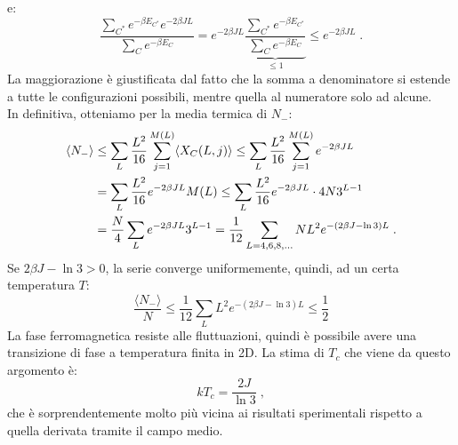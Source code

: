 \documentclass[10pt,a4paper]{report}
\theoremstyle{definition}
\numberwithin{equation}{section}
\newcommand{\bra}{\langle}
\newcommand{\ket}{\rangle}
\begin{document}
\begin{itemize}
$$$$
e:
\begin{equation}
\frac{\sum_{C^*}e^{-\beta E_{C^*}}e^{-2\beta JL}}{\sum_C e^{-\beta E_C}}=e^{-2\beta JL}\underbrace{\frac{\sum_{C^*}e^{-\beta E_{C^*}}}{\sum_C e^{-\beta E_C}}}_{\le 1}\le e^{-2\beta JL}\;.
\end{equation}
La maggiorazione è giustificata dal fatto che la somma a denominatore si estende a tutte le configurazioni possibili, mentre quella al numeratore solo ad alcune. \\
In definitiva, otteniamo per la media termica di $N_-$:
\begin{align}
\bra N_-\ket &\le \sum_L\frac{L^2}{16}\sum_{j=1}^{M(L)}\bra X_C(L,j)\ket \le \sum_L\frac{L^2}{16}\sum_{j=1}^{M(L)}e^{-2\beta JL} \notag \\
&=\sum_L\frac{L^2}{16}e^{-2\beta JL}M(L) \le \sum_L\frac{L^2}{16}e^{-2\beta JL}\cdot 4N3^{L-1} \notag \\
&=\frac{N}{4}\sum_Le^{-2\beta JL}3^{L-1} = \frac{1}{12}\sum_{L=4,6,8,\ldots}NL^2e^{-(2\beta J-\ln 3)L}\;.
\end{align}
Se $2\beta J-\ln 3>0$, la serie converge uniformemente, quindi, ad un certa temperatura $T$:
\begin{equation}
\frac{\bra N_-\ket}{N}\le \frac{1}{12}\sum_L L^2e^{-(2\beta J-\ln 3)L}\le \frac{1}{2}
\end{equation}
La fase ferromagnetica resiste alle fluttuazioni, quindi è possibile avere una transizione di fase a temperatura finita in 2D. La stima di $T_c$ che viene da questo argomento è:
\begin{equation}
kT_c=\frac{2J}{\ln 3}\;,
\end{equation}
che è sorprendentemente molto più vicina ai risultati sperimentali rispetto a quella derivata tramite il campo medio.
\end{itemize}
\end{document}
